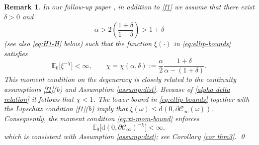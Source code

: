 \documentclass[11pt]{article}
\newcommand{\E}{\mathbb E}
\theoremstyle{rem}
\newtheorem{remark}{Remark}[section]
\begin{document}
\begin{remark}\label{remark boundary}
In our follow-up paper \cite{BMM26}, in addition to \ref{f1} we assume that there exist $\delta>0$ and
\begin{equation}\label{alpha delta relation}
\alpha>2\left(\frac{1+\delta}{1-\delta}\right)>1+\delta
\end{equation}
(see also \eqref{eq:H1-H} below) such that the function $\xi(\cdot)$ in \eqref{eq:ellip-bounds} satisfies
\begin{equation}\label{eq:xi-mom-bound}
\E_0\big[\xi^{-\chi}\big]<\infty,
\qquad
\chi=\chi(\alpha,\delta)
:=
\frac{\alpha}{2}
\frac{1+\delta}{\alpha-(1+\delta)}.
\end{equation}
This moment condition on the degeneracy is closely related to the continuity assumptions \ref{f1}(b) and Assumption \ref{assump:dist}. Because of \eqref{alpha delta relation}
it follows that $\chi<1$. The lower bound in \eqref{eq:ellip-bounds} together with the Lipschitz condition \ref{f1}(b) imply that
$\xi(\omega)
\leq
\mathrm d(0,\partial\mathcal C_\infty(\omega))$.
Consequently, the moment condition \eqref{eq:xi-mom-bound} enforces
\[
\E_0\big[
\mathrm d(0,\partial\mathcal C_\infty)^{-\chi}
\big]
<\infty,
\]
which is consistent with Assumption \ref{assump:dist}; see Corollary \ref{cor thm3}. 
\qed
\end{remark}
\end{document}
